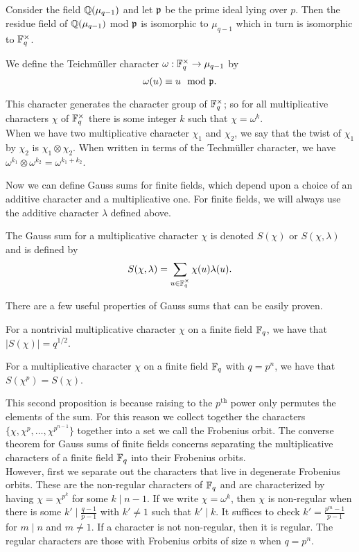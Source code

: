 Consider the field $\mathbb{Q}(\mu_{q-1})$ and let $\mathfrak{p}$ be the prime ideal lying over $p$.
Then the residue field of $\mathbb{Q}(\mu_{q-1})$ mod $\mathfrak{p}$ is isomorphic to $\mu_{q-1}$ which in turn is isomorphic to $\mathbb{F}_q^\times$.
\begin{defn}\label{Teichmuller}
We define the Teichm\"uller character $\omega : \mathbb{F}_q^\times \to \mu_{q-1}$ by \[\omega (u) \equiv  u \mod {\mathfrak{p}}.\]
\end{defn}
\noindent This character generates the character group of $\mathbb{F}_q^\times$; so for all multiplicative characters $\chi$ of $\mathbb{F}_q^\times$ there is some integer $k$ such that $\chi = \omega^k$.\\
When we have two multiplicative character $\chi_1$ and $\chi_2$, we say that the twist of $\chi_1$ by $\chi_2$ is $\chi_1 \otimes \chi_2$.
When written in terms of the Techm\"uller character, we have $\omega^{k_1} \otimes \omega^{k_2} = \omega^{k_1+k_2}$.

Now we can define Gauss sums for finite fields, which depend upon a choice of an additive character and a multiplicative one. 
For finite fields, we will always use the additive character $\lambda$ defined above.
\begin{defn}\label{GSumFF}
The Gauss sum for a multiplicative character $\chi$ is denoted $S(\chi)$ or $S(\chi, \lambda)$ and is defined by \[S(\chi, \lambda) = \sum_{u \in \mathbb{F}_q^\times} \chi(u) \lambda(u).\]
\end{defn}
\noindent There are a few useful properties of Gauss sums that can be easily proven.
\begin{prop}
For a nontrivial multiplicative character $\chi$ on a finite field $\mathbb{F}_q$, we have that $|S(\chi)| = q^{1/2}$.
\end{prop}
\begin{prop}
For a multiplicative character $\chi$ on a finite field $\mathbb{F}_q$ with $q = p^n$, we have that $S(\chi^p) = S(\chi)$.
\end{prop}
This second proposition is because raising to the $p^\text{th}$ power only permutes the elements of the sum. 
For this reason we collect together the characters $\{\chi, \chi^{p}, \ldots, \chi^{p^{n-1}}\}$ together into a set we call the Frobenius orbit.
The converse theorem for Gauss sums of finite fields concerns separating the multiplicative characters of a finite field $\mathbb{F}_q$ into their Frobenius orbits.\\

However, first we separate out the characters that live in degenerate Frobenius orbits. 
These are the non-regular characters of $\mathbb{F}_q$ and are characterized by having $\chi = \chi^{p^k}$ for some $k \mid n-1$. 
If we write $\chi = \omega^k$, then $\chi$ is non-regular when there is some $k' \mid \frac{q-1}{p-1}$ with $k' \neq 1$ such that $k' \mid k$.
It suffices to check $k' = \frac{p^m - 1}{p-1}$ for $m \mid n$ and $m \neq 1$.
If a character is not non-regular, then it is regular. 
The regular characters are those with Frobenius orbits of size $n$ when $q = p^n$.\\

